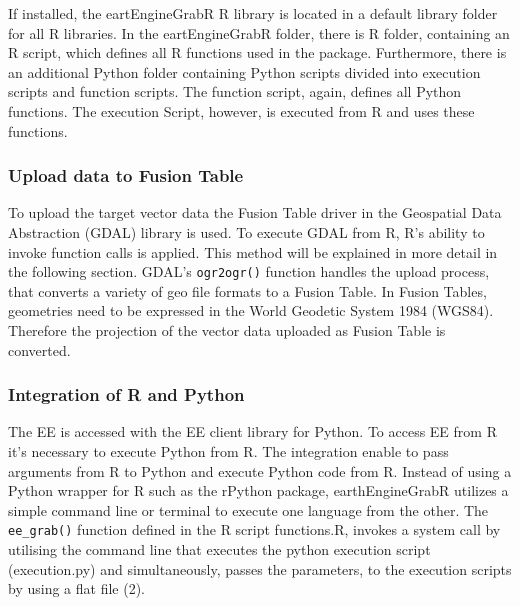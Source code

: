 If installed, the eartEngineGrabR R library is located in a default library folder for all R libraries. In the eartEngineGrabR folder, there is R folder, containing an R script, which defines all R functions used in the package. Furthermore, there is an additional Python folder containing Python scripts divided into execution scripts and function scripts. The function script, again, defines all Python functions. The execution Script, however, is executed from R and uses these functions.

\subsubsection{Upload data to Fusion Table}

To upload the target vector data the Fusion Table driver in the Geospatial Data Abstraction (GDAL) library is used. To execute GDAL from R, R's ability to invoke function calls is applied. This method will be explained in more detail in the following section. GDAL's \texttt{ogr2ogr()}  function handles the upload process, that converts a variety of geo file formats to a Fusion Table. In Fusion Tables, geometries need to be expressed in the World Geodetic System 1984 (WGS84). Therefore the projection of the vector data uploaded as Fusion Table is converted.

\subsubsection{Integration of R and Python}

The EE is accessed with the EE client library for Python. To access EE from R it's necessary to execute Python from R. The integration enable to pass arguments from R to Python and execute Python code from R. Instead of using a Python wrapper for R such as the rPython package, earthEngineGrabR utilizes a simple command line or terminal to execute one language from the other. The \texttt{ee\_grab()} function defined in the R script functions.R, invokes a system call by utilising the command line that executes the python execution script (execution.py) and simultaneously, passes the parameters, to the execution scripts by using a flat file (2). 

